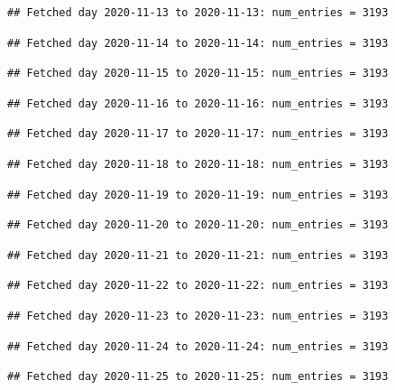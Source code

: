 \documentclass[]{article}
\begin{document}
\begin{verbatim}
## Fetched day 2020-11-13 to 2020-11-13: num_entries = 3193
\end{verbatim}

\begin{verbatim}
## Fetched day 2020-11-14 to 2020-11-14: num_entries = 3193
\end{verbatim}

\begin{verbatim}
## Fetched day 2020-11-15 to 2020-11-15: num_entries = 3193
\end{verbatim}

\begin{verbatim}
## Fetched day 2020-11-16 to 2020-11-16: num_entries = 3193
\end{verbatim}

\begin{verbatim}
## Fetched day 2020-11-17 to 2020-11-17: num_entries = 3193
\end{verbatim}

\begin{verbatim}
## Fetched day 2020-11-18 to 2020-11-18: num_entries = 3193
\end{verbatim}

\begin{verbatim}
## Fetched day 2020-11-19 to 2020-11-19: num_entries = 3193
\end{verbatim}

\begin{verbatim}
## Fetched day 2020-11-20 to 2020-11-20: num_entries = 3193
\end{verbatim}

\begin{verbatim}
## Fetched day 2020-11-21 to 2020-11-21: num_entries = 3193
\end{verbatim}

\begin{verbatim}
## Fetched day 2020-11-22 to 2020-11-22: num_entries = 3193
\end{verbatim}

\begin{verbatim}
## Fetched day 2020-11-23 to 2020-11-23: num_entries = 3193
\end{verbatim}

\begin{verbatim}
## Fetched day 2020-11-24 to 2020-11-24: num_entries = 3193
\end{verbatim}

\begin{verbatim}
## Fetched day 2020-11-25 to 2020-11-25: num_entries = 3193
\end{verbatim}
\end{document}
